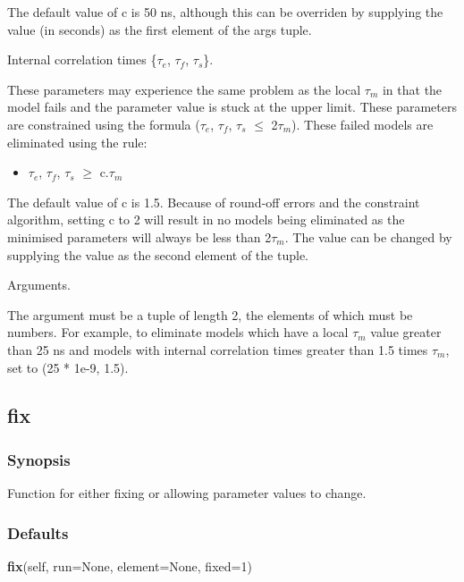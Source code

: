 The default value of c is 50 ns, although this can be overriden by supplying the value (in
seconds) as the first element of the args tuple.


Internal correlation times  \{$\tau_e$, $\tau_f$, $\tau_s$\}.

These parameters may experience the same problem as the local $\tau_m$ in that the model fails and
the parameter value is stuck at the upper limit.   These parameters are constrained using the
formula ($\tau_e$, $\tau_f$, $\tau_s$ $\le$ 2$\tau_m$).  These failed models are eliminated using the rule:

\begin{itemize}
\item[]     $\tau_e$, $\tau_f$, $\tau_s$ $\ge$ c.$\tau_m$
\end{itemize}

The default value of c is 1.5.  Because of round-off errors and the constraint  algorithm,
setting c to 2 will result in no models being eliminated as the minimised  parameters will
always be less than 2$\tau_m$.  The value can be changed by supplying the value as the second
element of the tuple.


Arguments.

The 
 argument must be a tuple of length 2, the elements of which must be numbers.  For
example, to eliminate models which have a local $\tau_m$ value greater than 25 ns and models with
internal correlation times  greater than 1.5 times $\tau_m$, set 
 to (25 * 1e-9, 1.5).


\newpage

\subsection{fix}


\subsubsection{Synopsis}

Function for either fixing or allowing parameter values to change.

\subsubsection{Defaults}

\textsf{\textbf{fix}(self, run=None, element=None, fixed=1)}


